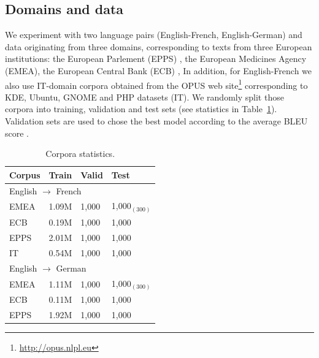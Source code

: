 \subsection{Domains and data \label{ssec:data}}

We experiment with two language pairs (English-French, English-German) and data originating from three domains, corresponding to texts from three European institutions: 
the European Parlement (EPPS) \cite{Koehn05europarl}, 
the European Medicines Agency (EMEA), 
the European Central Bank (ECB) \cite{Tiedemann09news},
In addition, for English-French we also use IT-domain corpora obtained from the OPUS web site\footnote{\url{http://opus.nlpl.eu}} corresponding to KDE, Ubuntu, GNOME and PHP datasets (IT).
%
We randomly split those corpora into training, validation and test sets (see statistics in Table~\ref{tab:Corpora}).
Validation sets are used to chose the best model according to the average BLEU score \cite{Papineni02bleu}.


\begin{table}[h]
  \centering
  \begin{tabular}{ |llll|} %
    \hline
    Corpus & Train & Valid & Test \\ 
    \hline
    \multicolumn{4}{l}{English $\rightarrow$ French }\\
    \hline
    EMEA  & 1.09M & 1,000 & 1,000$_{(300)}$\\
    ECB    & 0.19M & 1,000 & 1,000     \\
    EPPS   & 2.01M  & 1,000 & 1,000  \\
    IT         & 0.54M  & 1,000 & 1,000 \\  
    \hline
    \multicolumn{4}{l}{English $\rightarrow$ German}\\
    \hline
    EMEA  & 1.11M & 1,000 & 1,000$_{(300)}$ \\
    ECB     &  0.11M & 1,000 & 1,000  \\
    EPPS   & 1.92M & 1,000 & 1,000 \\ 
    \hline
\end{tabular}
\caption{Corpora statistics.}
\label{tab:Corpora}
\end{table}

